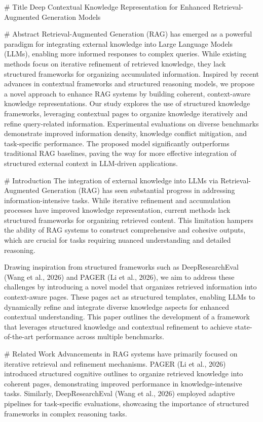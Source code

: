 # Title  
Deep Contextual Knowledge Representation for Enhanced Retrieval-Augmented Generation Models  

# Abstract  
Retrieval-Augmented Generation (RAG) has emerged as a powerful paradigm for integrating external knowledge into Large Language Models (LLMs), enabling more informed responses to complex queries. While existing methods focus on iterative refinement of retrieved knowledge, they lack structured frameworks for organizing accumulated information. Inspired by recent advances in contextual frameworks and structured reasoning models, we propose a novel approach to enhance RAG systems by building coherent, context-aware knowledge representations. Our study explores the use of structured knowledge frameworks, leveraging contextual pages to organize knowledge iteratively and refine query-related information. Experimental evaluations on diverse benchmarks demonstrate improved information density, knowledge conflict mitigation, and task-specific performance. The proposed model significantly outperforms traditional RAG baselines, paving the way for more effective integration of structured external context in LLM-driven applications.  

# Introduction  
The integration of external knowledge into LLMs via Retrieval-Augmented Generation (RAG) has seen substantial progress in addressing information-intensive tasks. While iterative refinement and accumulation processes have improved knowledge representation, current methods lack structured frameworks for organizing retrieved content. This limitation hampers the ability of RAG systems to construct comprehensive and cohesive outputs, which are crucial for tasks requiring nuanced understanding and detailed reasoning.  

Drawing inspiration from structured frameworks such as DeepResearchEval (Wang et al., 2026) and PAGER (Li et al., 2026), we aim to address these challenges by introducing a novel model that organizes retrieved information into context-aware pages. These pages act as structured templates, enabling LLMs to dynamically refine and integrate diverse knowledge aspects for enhanced contextual understanding. This paper outlines the development of a framework that leverages structured knowledge and contextual refinement to achieve state-of-the-art performance across multiple benchmarks.  

# Related Work  
Advancements in RAG systems have primarily focused on iterative retrieval and refinement mechanisms. PAGER (Li et al., 2026) introduced structured cognitive outlines to organize retrieved knowledge into coherent pages, demonstrating improved performance in knowledge-intensive tasks. Similarly, DeepResearchEval (Wang et al., 2026) employed adaptive pipelines for task-specific evaluations, showcasing the importance of structured frameworks in complex reasoning tasks.  

